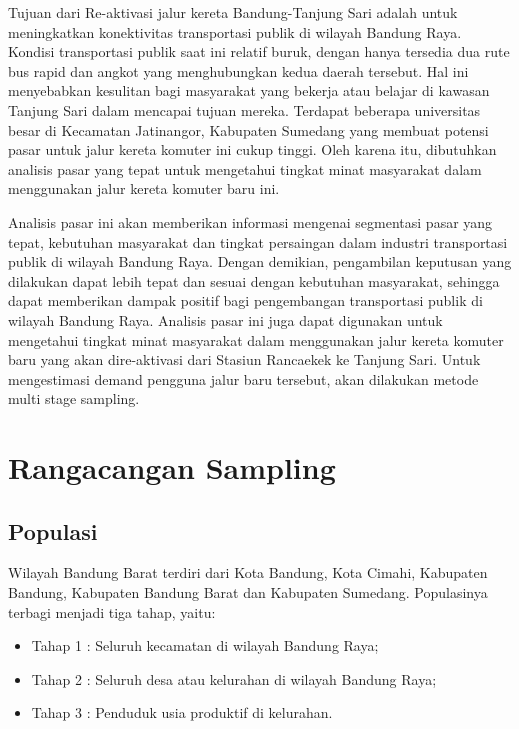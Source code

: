 \documentclass{article}
\begin{document}
Tujuan dari Re-aktivasi jalur kereta Bandung-Tanjung Sari adalah untuk meningkatkan konektivitas transportasi publik di wilayah Bandung Raya. Kondisi transportasi publik saat ini relatif buruk, dengan hanya tersedia dua rute bus rapid dan angkot yang menghubungkan kedua daerah tersebut. Hal ini menyebabkan kesulitan bagi masyarakat yang bekerja atau belajar di kawasan Tanjung Sari dalam mencapai tujuan mereka. Terdapat beberapa universitas besar di Kecamatan Jatinangor, Kabupaten Sumedang yang membuat potensi pasar untuk jalur kereta komuter ini cukup tinggi. Oleh karena itu, dibutuhkan analisis pasar yang tepat untuk mengetahui tingkat minat masyarakat dalam menggunakan jalur kereta komuter baru ini. \par

Analisis pasar ini akan memberikan informasi mengenai segmentasi pasar yang tepat, kebutuhan masyarakat dan tingkat persaingan dalam industri transportasi publik di wilayah Bandung Raya. Dengan demikian, pengambilan keputusan yang dilakukan dapat lebih tepat dan sesuai dengan kebutuhan masyarakat, sehingga dapat memberikan dampak positif bagi pengembangan transportasi publik di wilayah Bandung Raya. Analisis pasar ini juga dapat digunakan untuk mengetahui tingkat minat masyarakat dalam menggunakan jalur kereta komuter baru yang akan dire-aktivasi dari Stasiun Rancaekek ke Tanjung Sari. Untuk mengestimasi demand pengguna jalur baru tersebut, akan dilakukan metode multi stage sampling.

\section{Rangacangan Sampling} \par

\subsection{Populasi}
Wilayah Bandung Barat terdiri dari Kota Bandung, Kota Cimahi, Kabupaten Bandung, Kabupaten Bandung Barat dan Kabupaten Sumedang. Populasinya terbagi menjadi tiga tahap, yaitu:

\begin{itemize}
    \item Tahap 1 : Seluruh kecamatan di wilayah Bandung Raya;
    \item Tahap 2 : Seluruh desa atau kelurahan di wilayah Bandung Raya;
    \item Tahap 3 : Penduduk usia produktif di kelurahan.
\end{itemize}
    
\end{document}

